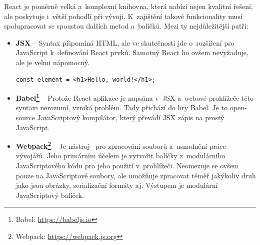React je poměrně velká a~komplexní knihovna, která nabízí nejen kvalitní řešení, ale poskytuje i~větší pohodlí při vývoji. K~zajištění takové funkcionality musí spolupracovat se spoustou dalších metod a~balíčků. Mezi ty nejdůležitější patří:
\begin{itemize}
    \item \textbf{JSX} -- Syntax připomíná HTML, ale ve skutečnosti jde o~rozšíření pro JavaScript k~definování React prvků. Samotný React ho ovšem nevyžaduje, ale je velmi nápomocný.
    \begin{center}
        \begin{lstlisting}[]
        const element = <h1>Hello, world!</h1>;
        \end{lstlisting}
    \end{center}

    \item \textbf{Babel\footnote{Babel: \url{https://babeljs.io}}} -- Protože React aplikace je napsána v~JSX a~webové prohlížeče této syntaxi nerozumí, vzniká problém. Tady přichází do hry Babel. Je to open-source JavaScriptový kompilátor, který převádí JSX zápis na prostý JavaScript.
    \item \textbf{Webpack\footnote{Webpack: \url{https://webpack.js.org}}} -- Je nástroj~\cite{book:LearningReact} pro zpracování souborů a~usnadnění práce vývojářů. Jeho primárním účelem je vytvořit balíčky z~modulárního JavaScriptového kódu pro jeho použití v~prohlížeči. Neomezuje se ovšem pouze na JavaScriptové soubory, ale umožňuje zpracovat téměř jakýkoliv druh jako jsou obrázky, serializační formáty aj. Výstupem je modulární JavaScriptový balíček.
\end{itemize}

